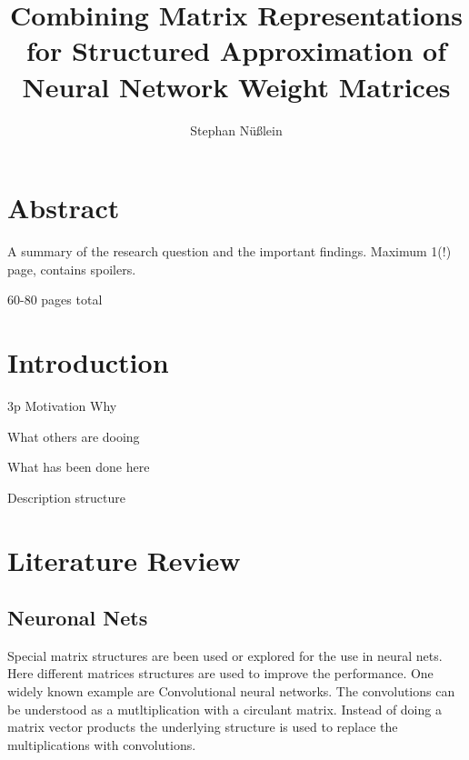 \documentclass[doctype=mastersthesis,BCOR=15mm,biblatex]{ldvbook}%
\begin{document}
\title{Combining Matrix Representations for Structured Approximation of Neural Network Weight Matrices}
\author{Stephan Nüßlein}


\maketitle[frontcover=Design1]


\chapter*{Abstract}

A summary of the research question and the important findings.
Maximum 1(!) page, contains spoilers.


\tableofcontents

60-80 pages total







\chapter{Introduction} 3p
Motivation Why

What others are dooing

What has been done here


Description structure


\chapter{Literature Review}
\section{Neuronal Nets}


Special matrix structures are been used or explored for the use in neural nets.
Here different matrices structures are used to improve the performance. 
One widely known example are Convolutional neural networks.
The convolutions can be understood as a mutltiplication with a circulant matrix. 
Instead of doing a matrix vector products the underlying structure is used to replace the multiplications with convolutions.
\end{document}
